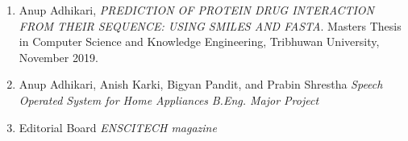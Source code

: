  
    
    \begin{enumerate}
     \item Anup Adhikari, {\it PREDICTION OF PROTEIN DRUG INTERACTION FROM THEIR SEQUENCE: USING SMILES AND FASTA}. Masters Thesis in Computer Science and Knowledge Engineering, Tribhuwan University, November 2019.
     \item Anup Adhikari, Anish Karki, Bigyan Pandit, and Prabin Shrestha {\it Speech Operated System for Home Appliances} {\it B.Eng. Major Project} 
     \item Editorial Board {\it ENSCITECH magazine} 
    \end{enumerate}
    
    